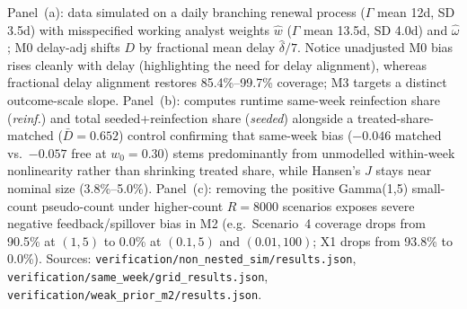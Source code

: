 \begin{table}[!t]
\par\smallskip\parbox{\linewidth}{\scriptsize Panel~(a): data simulated on a daily branching renewal process ($\Gamma$ mean 12d, SD 3.5d) with misspecified working analyst weights $\hat w$ ($\Gamma$ mean 13.5d, SD 4.0d) and $\hat\omega$; M0 delay-adj shifts $D$ by fractional mean delay $\hat\delta/7$. Notice unadjusted M0 bias rises cleanly with delay (highlighting the need for delay alignment), whereas fractional delay alignment restores 85.4\%--99.7\% coverage; M3 targets a distinct outcome-scale slope. Panel~(b): computes runtime same-week reinfection share (\emph{reinf.}) and total seeded+reinfection share (\emph{seeded}) alongside a treated-share-matched ($\bar D=0.652$) control confirming that same-week bias ($-0.046$ matched vs.\ $-0.057$ free at $w_0=0.30$) stems predominantly from unmodelled within-week nonlinearity rather than shrinking treated share, while Hansen's $J$ stays near nominal size (3.8\%--5.0\%). Panel~(c): removing the positive Gamma(1,5) small-count pseudo-count under higher-count $R=8000$ scenarios exposes severe negative feedback/spillover bias in M2 (e.g.\ Scenario~4 coverage drops from 90.5\% at $(1,5)$ to 0.0\% at $(0.1,5)$ and $(0.01,100)$; X1 drops from 93.8\% to 0.0\%). Sources: \texttt{verification/non\_nested\_sim/results.json}, \texttt{verification/same\_week/grid\_results.json}, \texttt{verification/weak\_prior\_m2/results.json}.}
\end{table}
